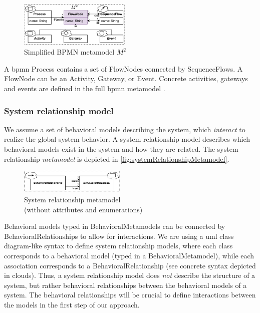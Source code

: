 \documentclass{jot}
\begin{document}
\begin{figure}[h]
    \centering
    \includegraphics[width=0.475\textwidth]{figures/bpmn_metamodel.pdf}
    \caption{Simplified BPMN metamodel $M^2$ \cite{objectmanagementgroupBusinessProcessModel2013}}
    \label{fig:bpmn_metamodel}
\end{figure}

A \gls*{bpmn} \textsf{Process} contains a set of \textsf{FlowNode}s connected by \textsf{SequenceFlow}s.
A \textsf{FlowNode} can be an \textsf{Activity}, \textsf{Gateway}, or \textsf{Event}.
Concrete activities, gateways and events are defined in the full \gls*{bpmn} metamodel \cite{objectmanagementgroupBusinessProcessModel2013}. %

\subsubsection{System relationship model}
We assume a set of behavioral models describing the system, which \emph{interact} to realize the global system behavior.
A system relationship model describes which behavioral models exist in the system and how they are related.
The system relationship \emph{metamodel} is depicted in \autoref{fig:systemRelationshipMetamodel}.

\begin{figure}[h]
    \centering
    \includegraphics[width=0.45\textwidth]{figures/systemRelationshipMetamodel.pdf}
    \caption{System relationship metamodel \\ (without attributes and enumerations)}
    \label{fig:systemRelationshipMetamodel}
\end{figure}

Behavioral models typed in \textsf{BehavioralMetamodel}s can be connected by \textsf{BehavioralRelationship}s to allow for interactions.
We are using a \gls*{uml} class diagram-like syntax to define system relationship models, where each class corresponds to a behavioral model (typed in a \textsf{BehavioralMetamodel}), while each association corresponds to a \textsf{BehavioralRelationship} (see concrete syntax depicted in clouds).
Thus, a system relationship model does \emph{not} describe the structure of a system, but rather behavioral relationships between the behavioral models of a system.
The behavioral relationships will be crucial to define interactions between the models in the first step of our approach.
\end{document}
